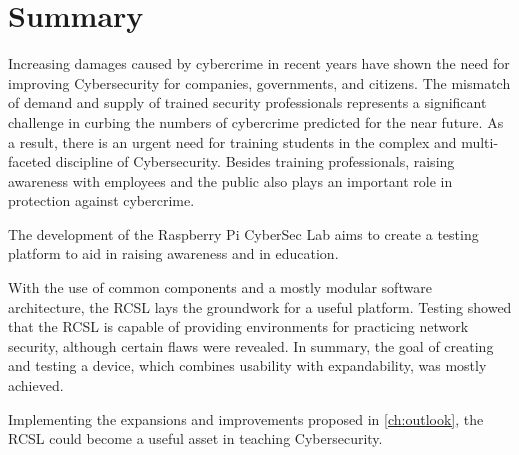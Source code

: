 \chapter{Summary}\label{ch:summary}
Increasing damages caused by cybercrime in recent years have shown the need for improving Cybersecurity for companies, governments, and citizens.
The mismatch of demand and supply of trained security professionals represents a significant challenge in curbing the numbers of cybercrime predicted for the near future.
As a result, there is an urgent need for training students in the complex and multi-faceted discipline of Cybersecurity.
Besides training professionals, raising awareness with employees and the public also plays an important role in protection against cybercrime.

The development of the Raspberry Pi CyberSec Lab aims to create a testing platform to aid in raising awareness and in education.

With the use of common components and a mostly modular software architecture, the RCSL lays the groundwork for a useful platform.
Testing showed that the RCSL is capable of providing environments for practicing network security, although certain flaws were revealed.
In summary, the goal of creating and testing a device, which combines usability with expandability, was mostly achieved.

Implementing the expansions and improvements proposed in \cref{ch:outlook}, the RCSL could become a useful asset in teaching Cybersecurity.
